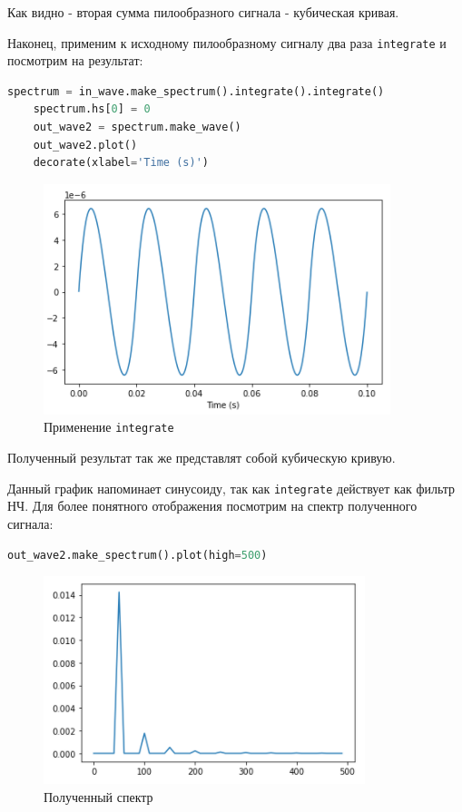 \documentclass[a4paper]{article}
\begin{document}
            Как видно - вторая сумма пилообразного сигнала - кубическая кривая.
            
            Наконец, применим к исходному пилообразному сигналу два раза \texttt{integrate} и посмотрим на результат:
            
\begin{lstlisting}[language=Python, caption= Применение \texttt{integrate}]
    spectrum = in_wave.make_spectrum().integrate().integrate()
    spectrum.hs[0] = 0
    out_wave2 = spectrum.make_wave()
    out_wave2.plot()
    decorate(xlabel='Time (s)')
\end{lstlisting}
            
            \begin{figure}[H]
                \centering
                \includegraphics{ex_4_4.png}
                \caption{Применение \texttt{integrate}}
                \label{fig:ex_4_4}
            \end{figure}
            
            Полученный результат так же представлят собой кубическую кривую.
            
            Данный график напоминает синусоиду, так как \texttt{integrate} действует как фильтр НЧ. Для более понятного отображения посмотрим на спектр полученного сигнала:
            
\begin{lstlisting}[language=Python, caption= Применение спектра]
    out_wave2.make_spectrum().plot(high=500)
\end{lstlisting}
            
            \begin{figure}[H]
                \centering
                \includegraphics{ex_4_5.png}
                \caption{Полученный спектр}
                \label{fig:ex_4_5}
            \end{figure}
            
\end{document}
